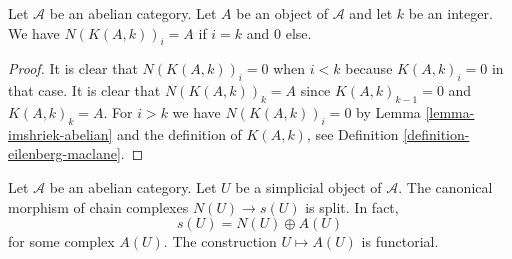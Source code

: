 \begin{lemma}
\label{lemma-N-K}
Let $\mathcal{A}$ be an abelian category.
Let $A$ be an object of $\mathcal{A}$ and
let $k$ be an integer. We have
$N(K(A, k))_i = A$ if $i = k$ and
$0$ else.
\end{lemma}

\begin{proof}
It is clear that $N(K(A, k))_i = 0$ when $i < k$
because $K(A, k)_i = 0$ in that case.
It is clear that $N(K(A, k))_k = A$ since
$K(A, k)_{k - 1} = 0$ and $K(A, k)_k = A$.
For $i > k$ we have $N(K(A, k))_i = 0$
by Lemma \ref{lemma-imshriek-abelian} and
the definition of $K(A, k)$, see Definition
\ref{definition-eilenberg-maclane}.
\end{proof}

\begin{lemma}
\label{lemma-decompose-associated-complexes}
Let $\mathcal{A}$ be an abelian category.
Let $U$ be a simplicial object of $\mathcal{A}$.
The canonical morphism of chain complexes
$N(U) \to s(U)$ is split. In fact,
$$
s(U) = N(U) \oplus A(U)
$$
for some complex $A(U)$. The construction $U \mapsto A(U)$
is functorial.
\end{lemma}

